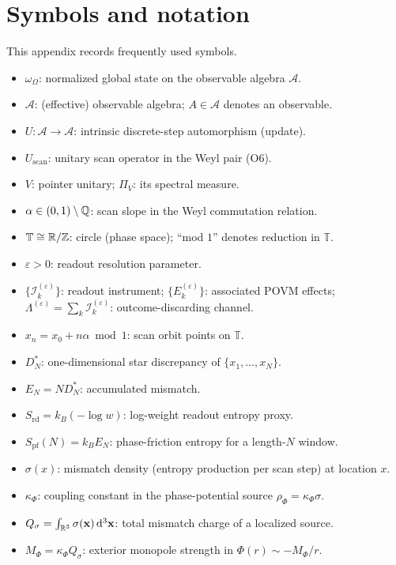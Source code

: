 \section{Symbols and notation}
\label{app:symbols}

This appendix records frequently used symbols.

\begin{itemize}
  \item $\omega_\Omega$: normalized global state on the observable algebra $\mathcal{A}$.
  \item $\mathcal{A}$: (effective) observable algebra; $A\in\mathcal{A}$ denotes an observable.
  \item $U:\mathcal{A}\to\mathcal{A}$: intrinsic discrete-step automorphism (update).
  \item $U_{\mathrm{scan}}$: unitary scan operator in the Weyl pair (O6).
  \item $V$: pointer unitary; $\Pi_V$: its spectral measure.
  \item $\alpha\in(0,1)\setminus\mathbb{Q}$: scan slope in the Weyl commutation relation.
  \item $\mathbb{T}\cong \mathbb{R}/\mathbb{Z}$: circle (phase space); ``mod $1$'' denotes reduction in $\mathbb{T}$.
  \item $\varepsilon>0$: readout resolution parameter.
  \item $\{\mathcal{I}_k^{(\varepsilon)}\}$: readout instrument; $\{E_k^{(\varepsilon)}\}$: associated POVM effects; $\Lambda^{(\varepsilon)}=\sum_k\mathcal{I}_k^{(\varepsilon)}$: outcome-discarding channel.
  \item $x_n=x_0+n\alpha\bmod 1$: scan orbit points on $\mathbb{T}$.
  \item $D_N^\ast$: one-dimensional star discrepancy of $\{x_1,\dots,x_N\}$.
  \item $E_N=N D_N^\ast$: accumulated mismatch.
  \item $S_{\mathrm{rd}}=k_B(-\log w)$: log-weight readout entropy proxy.
  \item $S_{\mathrm{pf}}(N)=k_B E_N$: phase-friction entropy for a length-$N$ window.
  \item $\sigma(x)$: mismatch density (entropy production per scan step) at location $x$.
  \item $\kappa_\Phi$: coupling constant in the phase-potential source $\rho_\Phi=\kappa_\Phi\sigma$.
  \item $Q_\sigma=\int_{\mathbb{R}^3}\sigma(\mathbf{x})\,\mathrm{d}^3\mathbf{x}$: total mismatch charge of a localized source.
  \item $M_\Phi=\kappa_\Phi Q_\sigma$: exterior monopole strength in $\Phi(r)\sim -M_\Phi/r$.

\end{itemize}
